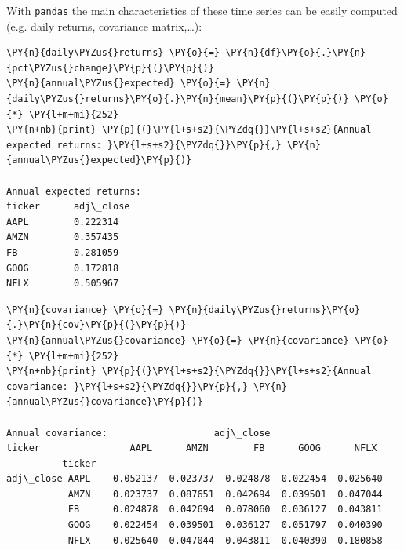 With \texttt{pandas} the main characteristics of these time series can
be easily computed (e.g. daily returns, covariance matrix,\ldots):

\begin{tcolorbox}[breakable, size=fbox, boxrule=1pt, pad at break*=1mm,colback=cellbackground, colframe=cellborder]
\begin{Verbatim}[commandchars=\\\{\}]
\PY{n}{daily\PYZus{}returns} \PY{o}{=} \PY{n}{df}\PY{o}{.}\PY{n}{pct\PYZus{}change}\PY{p}{(}\PY{p}{)}
\PY{n}{annual\PYZus{}expected} \PY{o}{=} \PY{n}{daily\PYZus{}returns}\PY{o}{.}\PY{n}{mean}\PY{p}{(}\PY{p}{)} \PY{o}{*} \PY{l+m+mi}{252}
\PY{n+nb}{print} \PY{p}{(}\PY{l+s+s2}{\PYZdq{}}\PY{l+s+s2}{Annual expected returns: }\PY{l+s+s2}{\PYZdq{}}\PY{p}{,} \PY{n}{annual\PYZus{}expected}\PY{p}{)}

Annual expected returns:             
ticker		adj\_close  
AAPL       	0.222314
AMZN     	0.357435
FB        	0.281059
GOOG    	0.172818
NFLX 	    0.505967
\end{Verbatim}
\end{tcolorbox}

\begin{tcolorbox}[breakable, size=fbox, boxrule=1pt, pad at break*=1mm,colback=cellbackground, colframe=cellborder]
\begin{Verbatim}[commandchars=\\\{\}]
\PY{n}{covariance} \PY{o}{=} \PY{n}{daily\PYZus{}returns}\PY{o}{.}\PY{n}{cov}\PY{p}{(}\PY{p}{)}
\PY{n}{annual\PYZus{}covariance} \PY{o}{=} \PY{n}{covariance} \PY{o}{*} \PY{l+m+mi}{252}
\PY{n+nb}{print} \PY{p}{(}\PY{l+s+s2}{\PYZdq{}}\PY{l+s+s2}{Annual covariance: }\PY{l+s+s2}{\PYZdq{}}\PY{p}{,} \PY{n}{annual\PYZus{}covariance}\PY{p}{)}

Annual covariance:                   adj\_close
ticker                AAPL      AMZN        FB      GOOG      NFLX
          ticker
adj\_close AAPL    0.052137  0.023737  0.024878  0.022454  0.025640
           AMZN    0.023737  0.087651  0.042694  0.039501  0.047044
           FB      0.024878  0.042694  0.078060  0.036127  0.043811
           GOOG    0.022454  0.039501  0.036127  0.051797  0.040390
           NFLX    0.025640  0.047044  0.043811  0.040390  0.180858
\end{Verbatim}
\end{tcolorbox}

